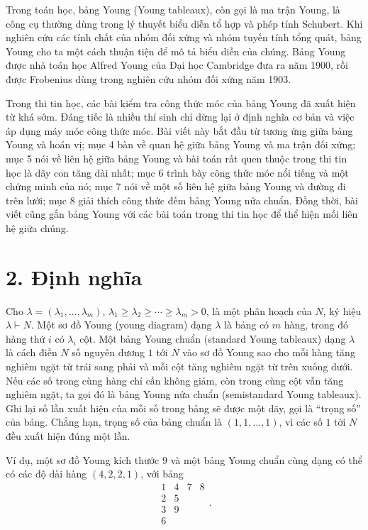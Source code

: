 \documentclass[11pt]{article}
\begin{document}
Trong toán học, bảng Young (Young tableaux), còn gọi là ma trận Young, là công
cụ thường dùng trong lý thuyết biểu diễn tổ hợp và phép tính Schubert. Khi
nghiên cứu các tính chất của nhóm đối xứng và nhóm tuyến tính tổng quát, bảng
Young cho ta một cách thuận tiện để mô tả biểu diễn của chúng. Bảng Young được
nhà toán học Alfred Young của Đại học Cambridge đưa ra năm 1900, rồi được
Frobenius dùng trong nghiên cứu nhóm đối xứng năm 1903.

Trong thi tin học, các bài kiểm tra công thức móc của bảng Young đã xuất hiện
từ khá sớm. Đáng tiếc là nhiều thí sinh chỉ dừng lại ở định nghĩa cơ bản và
việc áp dụng máy móc công thức móc. Bài viết này bắt đầu từ tương ứng giữa
bảng Young và hoán vị; mục 4 bàn về quan hệ giữa bảng Young và ma trận đối
xứng; mục 5 nói về liên hệ giữa bảng Young và bài toán rất quen thuộc trong
thi tin học là dãy con tăng dài nhất; mục 6 trình bày công thức móc nổi tiếng
và một chứng minh của nó; mục 7 nói về một số liên hệ giữa bảng Young và đường
đi trên lưới; mục 8 giải thích công thức đếm bảng Young nửa chuẩn. Đồng thời,
bài viết cũng gắn bảng Young với các bài toán trong thi tin học để thể hiện
mối liên hệ giữa chúng.

\section*{2. Định nghĩa}

Cho \(\lambda=(\lambda_1,\ldots,\lambda_m)\),
\(\lambda_1\ge\lambda_2\ge\cdots\ge\lambda_m>0\), là một phân hoạch của
\(N\), ký hiệu \(\lambda\vdash N\). Một sơ đồ Young (young diagram) dạng
\(\lambda\) là bảng có \(m\) hàng, trong đó hàng thứ \(i\) có \(\lambda_i\)
cột. Một bảng Young chuẩn (standard Young tableaux) dạng \(\lambda\) là cách
điền \(N\) số nguyên dương \(1\) tới \(N\) vào sơ đồ Young sao cho mỗi hàng
tăng nghiêm ngặt từ trái sang phải và mỗi cột tăng nghiêm ngặt từ trên xuống
dưới. Nếu các số trong cùng hàng chỉ cần không giảm, còn trong cùng cột vẫn
tăng nghiêm ngặt, ta gọi đó là bảng Young nửa chuẩn (semistandard Young
tableaux). Ghi lại số lần xuất hiện của mỗi số trong bảng sẽ được một dãy,
gọi là ``trọng số'' của bảng. Chẳng hạn, trọng số của bảng chuẩn là
\((1,1,\ldots,1)\), vì các số \(1\) tới \(N\) đều xuất hiện đúng một lần.

Ví dụ, một sơ đồ Young kích thước \(9\) và một bảng Young chuẩn cùng dạng có
thể có các độ dài hàng \((4,2,2,1)\), với bảng
\[
\begin{array}{cccc}
1&4&7&8\\
2&5\\
3&9\\
6
\end{array}.
\]
\end{document}
